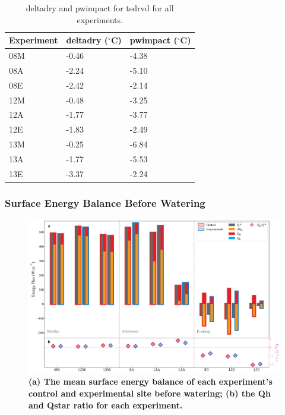 \documentclass[final,3p,times,authoryear]{elsarticle}
\begin{document}
\begin{table}[!ht]\caption{\gls{deltadry} and \gls{pwimpact} for \gls{tsdrvd} for all experiments.}
    \centering
    \begin{tabular}{|l|l|l|}
    \hline
        Experiment & \gls{deltadry} ($^{\circ}$C) &\gls{pwimpact} ($^{\circ}$C) \\ \hline
        08M & -0.46&-4.38 \\ \hline
        08A & -2.24&-5.10 \\ \hline
        08E & -2.42&-2.14 \\ \hline
        12M & -0.48&-3.25 \\ \hline
        12A & -1.77&-3.77 \\ \hline
        12E & -1.83&-2.49 \\ \hline
        13M & -0.25&-6.84 \\ \hline
        13A & -1.77&-5.53 \\ \hline
        13E & -3.37&-2.24 \\ \hline
    \end{tabular}\label{table:7.5}
\end{table}


\clearpage


\subsubsection{Surface Energy Balance Before Watering}\label{sec:appendix7.5.11}

\begin{figure}
\centering
\includegraphics[trim={0 0 0 0},clip,scale=1.0]{pict046.png}
\caption{\bf (a) The mean surface energy balance of each experiment's control and experimental site before watering; (b) the \gls{Qh} and \gls{Qstar} ratio for each experiment.}
 \label{fig:7.18}
\end{figure}
\clearpage
\end{document}
